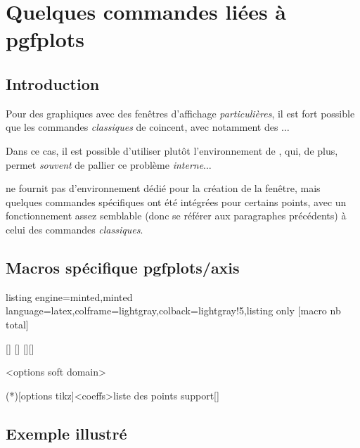 \documentclass[11pt,a4paper]{ltxdoc}
\begin{document}
\newpage

\section{Quelques commandes liées à pgfplots}

\subsection{Introduction}

Pour des graphiques avec des fenêtres d'affichage \textit{particulières}, il est fort possible que les commandes \textit{classiques} de  coincent, avec notamment des $\ldots$

\smallskip

Dans ce cas, il est possible d'utiliser plutôt l'environnement  de , qui, de plus, permet \textit{souvent} de pallier ce problème \textit{interne}$\ldots$

 ne fournit pas d'environnement dédié pour la création de la fenêtre, mais quelques commandes spécifiques ont été intégrées pour certains points, avec un fonctionnement assez semblable (donc se référer aux paragraphes précédents) à celui des commandes \textit{classiques}.

\subsection{Macros spécifique pgfplots/axis}

\begin{tcblisting}{listing engine=minted,minted language=latex,colframe=lightgray,colback=lightgray!5,listing only}
[macro nb total]

[\myxcoord]
[\myycoord]
[\myxcoord][\myycoord]

<options soft domain>

\addplotspline(*)[options tikz]<coeffs>{liste des points support}[\monspline]
\end{tcblisting}

\subsection{Exemple illustré}
\end{document}
